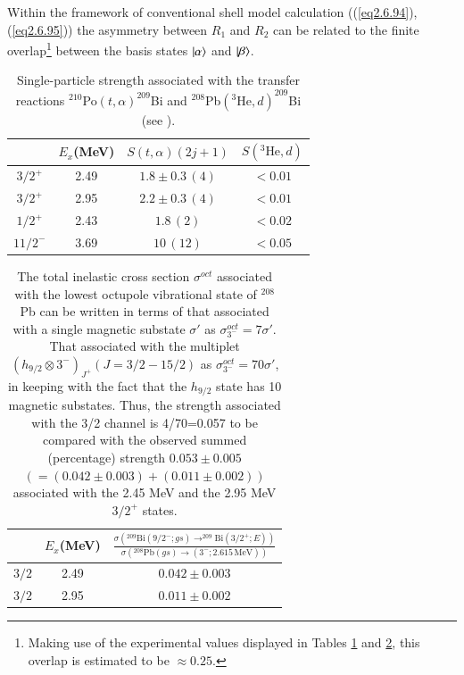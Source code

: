 Within the framework of conventional shell model calculation ((\ref{eq2.6.94}), (\ref{eq2.6.95})) the asymmetry between $R_1$ and $R_2$ can be related to the finite overlap\footnote{Making use of the experimental values displayed in Tables \ref{tabintroC1} and  \ref{tabintroC2}, this overlap is estimated to be $\approx0.25$.} between the basis states $|{\alpha} \rangle$ and $|{\beta} \rangle$.

\begin{table}
	\begin{tabular}{|c|c|c|c|}
		\hline 
		& $E_x$(MeV) & $S(t,\alpha)(2j+1)$ & $S(^3\text{He},d)$ \\
		\hline 
		$3/2^+$ & 2.49 & $1.8\pm0.3\,(4)$  & $<0.01$  \\ 
		$3/2^+$ & 2.95 & $2.2\pm0.3\,(4)$  & $<0.01$ \\ 
		$1/2^+$& 2.43 &  $1.8\,(2)$& $<0.02$ \\ 
		$11/2^-$& 3.69 & $10\,(12)$ &  $<0.05$\\ 
		\hline
	\end{tabular}\caption{Single-particle strength associated with the  transfer reactions  $^{210}$Po$(t,\alpha)^{209}$Bi and $^{208}$Pb$(^3\text{He},d)^{209}$Bi (see \cite{Bortignon:77}).}\label{tabintroC1}
\end{table}
\begin{table}
	\begin{tabular}{|c|c|c|}
		\hline 
		& $E_x$(MeV) & $\frac{\sigma\left(^{209}\text{Bi}(9/2^-;gs)\rightarrow^{209}\text{Bi}(3/2^+;E)\right)}{\sigma\left(^{208}\text{Pb}(gs)\rightarrow (3^-;2.615\, \text{MeV})\right)}$  \\
		\hline 
		$3/2$ & 2.49 & $0.042\pm0.003$   \\ 
		$3/2$ & 2.95 & $0.011\pm0.002$  \\ 
		\hline
	\end{tabular}\caption{The total inelastic cross section $\sigma^{oct}$ associated with the lowest octupole vibrational state of $^{208}$Pb can be written in terms of that associated with a single magnetic substate $\sigma'$ as $\sigma_{3^-}^{oct}=7\sigma'$. That associated with the multiplet $(h_{9/2}\otimes 3^-)_{J^+} (J=3/2-15/2)$ as $\sigma_{3^-}^{oct}=70\sigma'$, in keeping with the fact that the $h_{9/2}$ state has 10 magnetic substates. Thus, the strength associated with the 3/2 channel is 4/70=0.057 to be compared with the observed summed (percentage) strength $0.053\pm0.005 $ $(=(0.042\pm0.003)+(0.011\pm0.002))$ associated with the 2.45 MeV and the 2.95 MeV $3/2^+$ states.}\label{tabintroC2}
\end{table}

